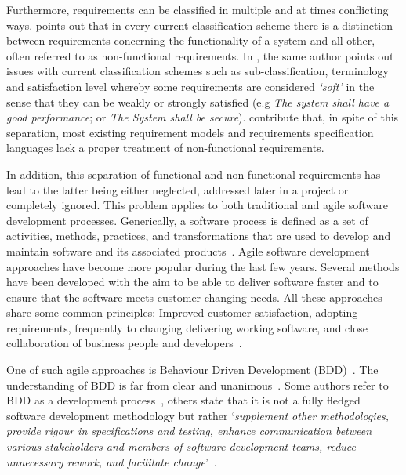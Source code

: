 \documentclass[dissertation]{softeng}
\begin{document}
Furthermore, requirements can be classified in multiple and at times conflicting ways. \citet{Glinz:2007ehba} points out that in every current classification scheme there is a distinction between requirements concerning the functionality of a system and all other, often referred to as non-functional requirements. In , the same author points out issues with current classification schemes such as sub-classification, terminology and satisfaction level whereby some requirements are considered \emph{`soft'} in the sense that they can be weakly or strongly satisfied (e.g \emph{The system shall have a good performance}; or \emph{The System shall be secure}). \citet{Chung:2009vg} contribute that, in spite of this separation, most existing requirement models and requirements specification languages lack a proper treatment of non-functional requirements. 

In addition, this separation of functional and non-functional requirements has lead to the latter being either neglected, addressed later in a project or completely ignored. This problem applies to both traditional and agile software development processes. Generically, a software process is defined as a set of activities, methods, practices, and transformations that are used to develop and maintain software and its associated products~\citep{Cugola:1998htba}. Agile software development approaches have become more popular during the last few years. Several methods have been developed with the aim to be able to deliver software faster and to ensure that the software meets customer changing needs. All these approaches share some common principles: Improved customer satisfaction, adopting requirements, frequently to changing delivering working software, and close collaboration of business people and developers~\citep{Paetsch:2003tl}.

One of such agile approaches is Behaviour Driven Development (BDD)~\citep{North2006}. The understanding of BDD is far from clear and unanimous~\citep{Solis0}. Some authors refer to BDD as a development process~\citep{Smart201410}, others state that it is not a fully fledged software development methodology but rather `\emph{supplement other methodologies, provide rigour in specifications and testing, enhance communication between various stakeholders and members of software development teams, reduce unnecessary rework, and facilitate change}'~\citep{Adzic201106}.
\end{document}
